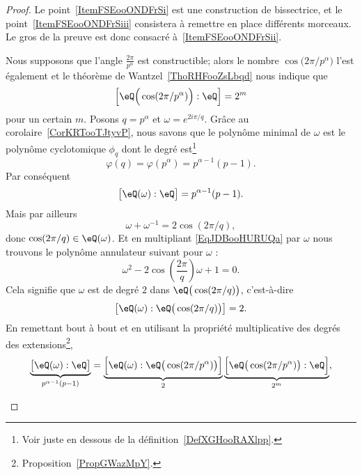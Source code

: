 \begin{proof}
	Le point~\ref{ItemFSEooONDFrSi} est une construction de bissectrice, et le point~\ref{ItemFSEooONDFrSiii} consistera à remettre en place différents morceaux. Le gros de la preuve est donc consacré à~\ref{ItemFSEooONDFrSii}.
	\begin{subproof}
		Nous supposons que l'angle \( \frac{ 2\pi }{ p^{\alpha} }\) est constructible; alors le nombre \( \cos\big( 2\pi/p^{\alpha} \big)\) l'est également et le théorème de Wantzel~\ref{ThoRHFooZsLbqd} nous indique que
		\begin{equation}
			\left[ \eQ\Big( \cos(2\pi/p^{\alpha}) \Big):\eQ \right]=2^m
		\end{equation}
		pour un certain \( m\). Posons \( q=p^{\alpha}\) et \( \omega= e^{2i\pi/q}\). Grâce au corolaire~\ref{CorKRTooTJtyvP}, nous savons que le polynôme minimal de \( \omega\) est le polynôme cyclotomique \( \phi_q\) dont le
		degré est\footnote{Voir juste en dessous de la définition~\ref{DefXGHooRAXlpp}.}         %
		\begin{equation}
			\varphi(q)=\varphi(p^{\alpha})=p^{\alpha-1}(p-1).
		\end{equation}
		Par conséquent
		\begin{equation}
			\big[ \eQ(\omega):\eQ \big]=p^{\alpha-1}(p-1).
		\end{equation}
		Mais par ailleurs
		\begin{equation}    \label{EqJDBooHURUQa}
			\omega+\omega^{-1}=2\cos(2\pi/q),
		\end{equation}
		donc \( \cos(2\pi/q)\in \eQ(\omega)\). Et en multipliant \eqref{EqJDBooHURUQa} par \( \omega\) nous trouvons le polynôme annulateur suivant pour \( \omega\) :
		\begin{equation}
			\omega^2-2\cos\left( \frac{ 2\pi }{ q } \right)\omega+1=0.
		\end{equation}
		Cela signifie que \( \omega\) est de degré \( 2\) dans \( \eQ\big( \cos(2\pi/q) \big)\), c'est-à-dire
		\begin{equation}    \label{EqSJXooRCLJyt}
			\big[ \eQ(\omega):\eQ\big( \cos(2\pi/q) \big) \big]=2.
		\end{equation}
		En remettant bout à bout et en utilisant la propriété multiplicative des degrés des extensions\footnote{Proposition~\ref{PropGWazMpY}.},
		\begin{equation}
			\underbrace{\big[ \eQ(\omega):\eQ \big]}_{p^{\alpha-1}(p-1)}=\underbrace{\Big[ \eQ(\omega):\eQ\big( \cos(2\pi/p^{\alpha}) \big) \Big]}_{2}\underbrace{\Big[ \eQ\big( \cos(2\pi/p^{\alpha}) \big):\eQ \Big]}_{2^m},

\end{equation}
\end{subproof}
\end{proof}
